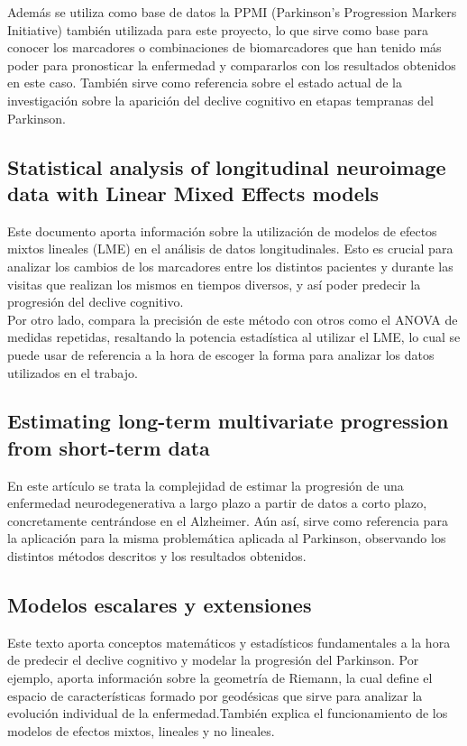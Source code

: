 Además se utiliza como base de datos la PPMI (Parkinson's Progression Markers Initiative) también utilizada para este proyecto, lo que sirve como base para conocer los marcadores o combinaciones de biomarcadores que han tenido más poder para pronosticar la enfermedad y compararlos con los resultados obtenidos en este caso. También sirve como referencia sobre el estado actual de la investigación sobre la aparición del declive cognitivo en etapas tempranas del Parkinson.

\subsection{Statistical analysis of longitudinal neuroimage data with Linear Mixed Effects models}
Este documento aporta información sobre la utilización de modelos de efectos mixtos lineales (LME) en el análisis de datos longitudinales. Esto es crucial para analizar los cambios de los marcadores entre los distintos pacientes y durante las visitas que realizan los mismos en tiempos diversos, y así poder predecir la progresión del declive cognitivo.\\

Por otro lado, compara la precisión de este método con otros como el ANOVA de medidas repetidas, resaltando la potencia estadística al utilizar el LME, lo cual se puede usar de referencia a la hora de escoger la forma para analizar los datos utilizados en el trabajo. 

\subsection{Estimating long-term multivariate progression from short-term data}
En este artículo se trata la complejidad de estimar la progresión de una enfermedad neurodegenerativa a largo plazo a partir de datos a corto plazo, concretamente centrándose en el Alzheimer. Aún así, sirve como referencia para la aplicación para la misma problemática aplicada al Parkinson, observando los distintos métodos descritos y los resultados obtenidos.\\

\subsection{Modelos escalares y extensiones}
Este texto aporta conceptos matemáticos y estadísticos fundamentales a la hora de predecir el declive cognitivo y modelar la progresión del Parkinson. Por ejemplo, aporta información sobre la geometría de Riemann, la cual define el espacio de características formado por geodésicas que sirve para analizar la evolución individual de la enfermedad.También explica el funcionamiento de los modelos de efectos mixtos, lineales y no lineales.\\

